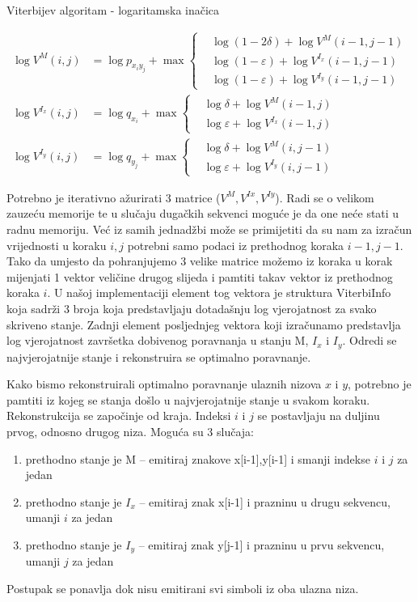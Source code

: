 \documentclass[times, utf8, seminar, numeric]{fer}
\begin{document}
\begin{algorithm}
	\caption{Viterbijev algoritam - logaritamska inačica}
	\label{alg:viterbilog}
	\begin{align*}
		\log{V^{M}(i, j)} &= \log{p_{x_{i} y_{j}}} + \max \left\{ \begin{aligned}
			&\log(1 - 2\delta) + \log{V^{M}}(i - 1, j - 1) \\
			&\log(1 - \varepsilon) + \log{V^{I_x}}(i - 1, j - 1) \\
			&\log(1 - \varepsilon) + \log{V^{I_y}}(i - 1, j - 1)
		\end{aligned}  \\
		\log{V^{I_x}(i, j)} &= \log{q_{x_{i}}} + \max \left\{ \begin{aligned}
			&\log{\delta} + \log{V^{M}(i - 1, j)} \\
			&\log{\varepsilon} + \log{V^{I_x}(i - 1, j)}
		\end{aligned}  \\
		\log{V^{I_y}(i, j)} &= \log{q_{y_{j}}} + \max \left\{ \begin{aligned}
			&\log{\delta} + \log{V^{M}}(i, j - 1) \\
			&\log{\varepsilon} + \log{V^{I_y}}(i, j - 1)
		\end{aligned} 
	\end{align*}
	
	
\end{algorithm}
Potrebno je iterativno ažurirati 3 matrice ($V^{M},V^{Ix},V^{Iy}$). Radi se o velikom zauzeću memorije te u slučaju dugačkih sekvenci moguće je da one neće stati u radnu memoriju. Već iz samih jednadžbi može se primijetiti da su nam za izračun vrijednosti u koraku $i,j$ potrebni samo podaci iz prethodnog koraka $i-1, j-1$. Tako da umjesto da pohranjujemo 3 velike matrice možemo iz koraka u korak mijenjati 1 vektor veličine drugog slijeda i pamtiti takav vektor iz prethodnog koraka $i$. U našoj implementaciji element tog vektora je struktura ViterbiInfo koja sadrži 3 broja koja predstavljaju dotadašnju log vjerojatnost za svako skriveno stanje. Zadnji element posljednjeg vektora koji izračunamo predstavlja log vjerojatnost završetka dobivenog poravnanja u stanju M, $I_{x}$ i $I_{y}$. Odredi se najvjerojatnije stanje i rekonstruira se optimalno poravnanje.

Kako bismo rekonstruirali optimalno poravnanje ulaznih nizova $x$ i $y$, potrebno je pamtiti iz kojeg se stanja došlo u najvjerojatnije stanje u svakom koraku. Rekonstrukcija se započinje od kraja. Indeksi $i$ i $j$ se postavljaju na duljinu prvog, odnosno drugog niza. Moguća su 3 slučaja:
\begin{enumerate}
	\item prethodno stanje je M – emitiraj znakove x[i-1],y[i-1] i smanji indekse $i$ i $j$ za jedan
	\item prethodno stanje je $I_{x}$ – emitiraj znak x[i-1] i prazninu u drugu sekvencu, umanji $i$ za jedan
	\item prethodno stanje je $I_{y}$ – emitiraj znak y[j-1] i prazninu u prvu sekvencu, umanji $j$ za jedan
\end{enumerate}
 Postupak se ponavlja dok nisu emitirani svi simboli iz oba ulazna niza.
 
\end{document}
